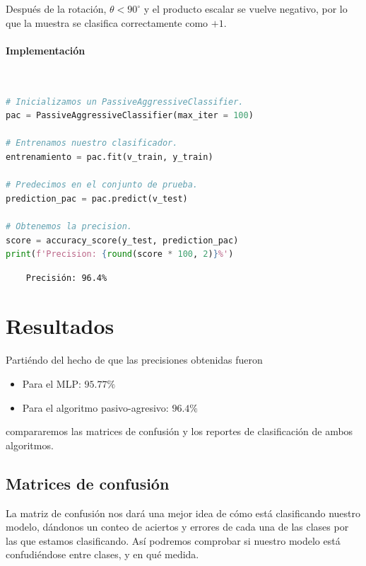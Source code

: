 \documentclass[letterpaper,11pt]{article}
\newcommand{\subsubsubsection}[1]{\paragraph{#1}\mbox{}\\}
\begin{document}
Después de la rotación, $\theta < 90^{\circ}$ y el producto escalar se vuelve 
negativo, por lo que la muestra se clasifica correctamente como $+1$. 

\subsubsubsection{Implementación}

\begin{lstlisting}[language = Python]
# Inicializamos un PassiveAggressiveClassifier.
pac = PassiveAggressiveClassifier(max_iter = 100)

# Entrenamos nuestro clasificador.
entrenamiento = pac.fit(v_train, y_train)

# Predecimos en el conjunto de prueba.
prediction_pac = pac.predict(v_test)

# Obtenemos la precision.
score = accuracy_score(y_test, prediction_pac)
print(f'Precision: {round(score * 100, 2)}%')
\end{lstlisting}

\begin{verbatim}
    Precisión: 96.4%
\end{verbatim}

\section{Resultados}

Partiéndo del hecho de que las precisiones obtenidas fueron
\begin{itemize}
    \item Para el MLP: $95.77\%$
    \item Para el algoritmo pasivo-agresivo: $96.4\%$
\end{itemize}

compararemos las matrices de confusión y los reportes de clasificación de ambos 
algoritmos. 

\subsection{Matrices de confusión}

La matriz de confusión nos dará una mejor idea de cómo está clasificando 
nuestro modelo, dándonos un conteo de aciertos y errores de cada una de las 
clases por las que estamos clasificando. Así podremos comprobar si nuestro 
modelo está confudiéndose entre clases, y en qué medida.
\end{document}
